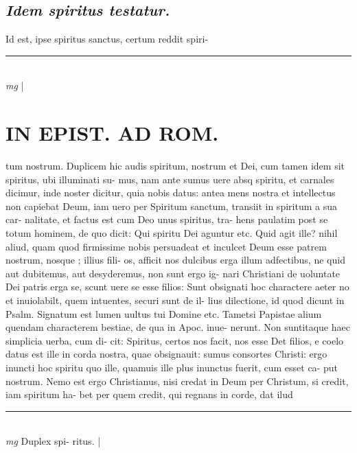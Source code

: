 \documentclass{article}
\begin{document}
\begin{pages}
\subsection*{\textit{Idem spiritus testatur. }}\pstart Id est, ipse spiritus sanctus, certum reddit spiri-  \pend
\vspace{0.5cm}\noindent
\vspace{0.2cm}\rule{1cm}{0.2pt}\\ 
\hspace{0.2cm}\textit{mg}
\footnotesize 
\normalsize| 
\section*{ IN EPIST. AD ROM.  }
\marginpar{[ p.]}\pstart tum nostrum. Duplicem hic audis spiritum, nostrum et Dei, cum tamen idem sit spiritus, ubi illuminati su- mus, nam ante sumus uere absq spiritu, et carnales dicimur, inde noster dicitur, quia nobis datus: antea mens nostra et intellectus non capiebat Deum, iam uero per Spiritum sanctum, transiit in spiritum a sua car- nalitate, et factus est cum Deo unus spiritus, tra- hens paulatim post se totum hominem, de quo dicit: Qui spiritu Dei aguntur etc. Quid agit ille? nihil aliud, quam quod firmissime nobis persuadeat et inculcet Deum esse patrem nostrum, nosque ; illius fili- os, afficit nos dulcibus erga illum adfectibus, ne quid aut dubitemus, aut desyderemus, non sunt ergo ig- nari Christiani de uoluntate Dei patris erga se, scunt uere se esse filios: Sunt obsignati hoc charactere aeter no et inuiolabilt, quem intuentes, securi sunt de il- lius dilectione, id quod dicunt in Psalm. Signatum est lumen uultus tui Domine etc. Tametsi Papistae alium quendam characterem bestiae, de qua in Apoc. inue- nerunt. Non suntitaque haec simplicia uerba, cum di- cit: Spiritus, certos nos facit, nos esse Det filios, e coelo datus est ille in corda nostra, quae obsignauit: sumus consortes Christi: ergo inuncti hoc spiritu quo ille, quamuis ille plus inunctus fuerit, cum esset ca- put nostrum. Nemo est ergo Christianus, nisi credat in Deum per Christum, si credit, iam spiritum ha- bet per quem credit, qui regnans in corde, dat ilud  \pend
\vspace{0.5cm}\noindent
\vspace{0.2cm}\rule{1cm}{0.2pt}\\ 
\hspace{0.2cm}\textit{mg}
\footnotesize Duplex spi- ritus.  
\normalsize| 

\end{pages}
\end{document}
